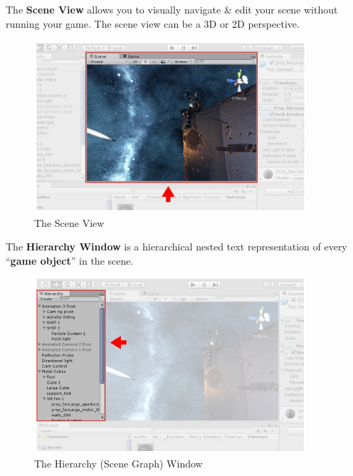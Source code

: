 \documentclass[a4paper,11pt]{article}
\begin{document}
The \textbf{Scene View} allows you to visually navigate \& edit your scene without running your game. 
The scene view can be a 3D or 2D perspective.
\begin{figure}[H]
    \centering
    \includegraphics[width=0.9\textwidth]{./images/scene_view.png}
    \caption{The Scene View}
\end{figure}

The \textbf{Hierarchy Window} is a hierarchical nested text representation of every ``\textbf{game object}'' in the scene.
\begin{figure}[H]
    \centering
    \includegraphics[width=0.9\textwidth]{./images/hierarchy_window.png}
    \caption{The Hierarchy (Scene Graph) Window}
\end{figure}
\end{document}
